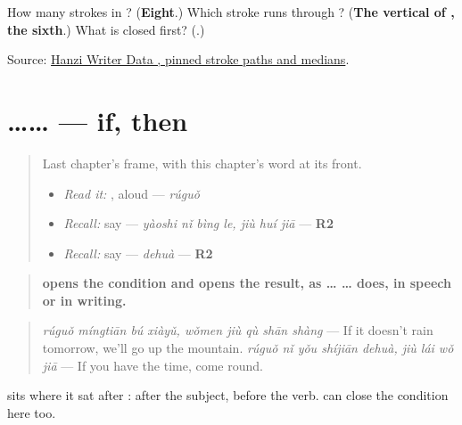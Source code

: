 \begin{tcolorbox}[breakable,colback=teal!4,colframe=teal!35!black,title={Before you move on}]
How many strokes in ? (\textbf{Eight}.) Which stroke runs through ? (\textbf{The vertical of , the sixth}.) What is closed first? (\textbf{}.)

Source: \href{https://raw.githubusercontent.com/chanind/hanzi-writer-data/68d10a4b21150cae5e1ebbd223eed289cf32d90c/data/\%E6\%9E\%9C.json}{Hanzi Writer Data , pinned stroke paths and medians}.
\end{tcolorbox}
\section[\texorpdfstring{\zh{如果}…\zh{就}… (rúguǒ … jiù …)}{如果…就… (rúguǒ … jiù …)}]{…… — if, then}

\label{lesson:ZH-C289-ruguo-jiu}



\begin{quote}
Last chapter's frame, with this chapter's word at its front.

\begin{itemize}
\raggedright
  \item \emph{Read it:} , aloud — \emph{rúguǒ}
  \item \emph{Recall:} say   — \emph{yàoshi nǐ bìng le, jiù huí jiā} — \textbf{R2}
  \item \emph{Recall:} say  — \emph{dehuà} — \textbf{R2}
\end{itemize}
\end{quote}

\begin{grammarlens}[title={Grammar Lens: \zh{如果} … \zh{就} …, if and then}]
\begin{quote}
\textbf{ opens the condition and  opens the result, as  …  … does, in speech or in writing.}
\end{quote}

\begin{quote}
\textbf{ } \emph{rúguǒ míngtiān bú xiàyǔ, wǒmen jiù qù shān shàng} — If it doesn't rain tomorrow, we'll go up the mountain. \textbf{ } \emph{rúguǒ nǐ yǒu shíjiān dehuà, jiù lái wǒ jiā} — If you have the time, come round.
\end{quote}

 sits where it sat after : after the subject, before the verb.  can close the condition here too.
\end{grammarlens}

